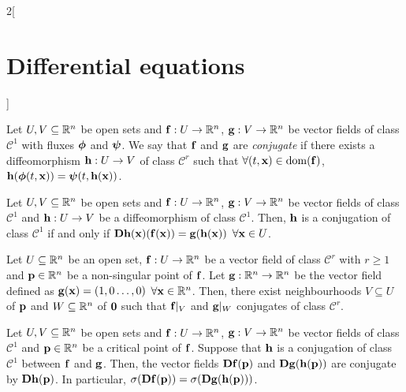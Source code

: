 \documentclass[../../../main.tex]{subfiles}
\begin{document}
\begin{multicols}{2}[\section{Differential equations}]
\begin{definition}
    \end{definition}
    \begin{definition}
        Let $U,V\subseteq \RR^n$ be open sets and $\vf{f}:U\rightarrow\RR^n$, $\vf{g}:V\rightarrow\RR^n$ be vector fields of class $\mathcal{C}^1$ with fluxes $\vf{\phi}$ and $\vf{\psi}$. We say that $\vf{f}$ and $\vf{g}$ are \textit{conjugate} if there exists a diffeomorphism $\vf{h}:U\rightarrow V$ of class $\mathcal{C}^r$ such that $\forall (t,\vf{x})\in \domain(\vf{f})$, $\vf{h}(\vf{\phi}(t,\vf{x}))=\vf{\psi}(t,\vf{h}(\vf{x}))$.
    \end{definition}
    \begin{lemma}
        Let $U,V\subseteq \RR^n$ be open sets and $\vf{f}:U\rightarrow\RR^n$, $\vf{g}:V\rightarrow\RR^n$ be vector fields of class $\mathcal{C}^1$ and $\vf{h}:U\rightarrow V$ be a diffeomorphism of class $\mathcal{C}^1$. Then, $\vf{h}$ is a conjugation of class $\mathcal{C}^1$ if and only if $\vf{Dh}(\vf{x})(\vf{f}(\vf{x}))=\vf{g}(\vf{h}(\vf{x}))$ $\forall \vf{x}\in U$.
    \end{lemma}
    \begin{theorem}
        Let $U\subseteq \RR^n$ be an open set, $\vf{f}:U\rightarrow\RR^n$ be a vector field of class $\mathcal{C}^r$ with $r\geq 1$ and $\vf{p}\in\RR^n$ be a non-singular point of $\vf{f}$. Let $\vf{g}:\RR^n\rightarrow\RR^n$ be the vector field defined as $\vf{g}(\vf{x})=(1,0\ldots,0)$ $\forall \vf{x}\in\RR^n$. Then, there exist neighbourhoods $V\subseteq U$ of $\vf{p}$ and $W\subseteq \RR^n$ of $\vf{0}$ such that $\vf{f}|_V$ and $\vf{g}|_W$ conjugates of class $\mathcal{C}^r$.
    \end{theorem}
    \begin{lemma}
        Let $U,V\subseteq \RR^n$ be open sets and $\vf{f}:U\rightarrow\RR^n$, $\vf{g}:V\rightarrow\RR^n$ be vector fields of class $\mathcal{C}^1$ and $\vf{p}\in\RR^n$ be a critical point of $\vf{f}$. Suppose that $\vf{h}$ is a conjugation of class $\mathcal{C}^1$ between $\vf{f}$ and $\vf{g}$. Then, the vector fields $\vf{Df}(\vf{p})$ and $\vf{Dg}(\vf{h}(\vf{p}))$ are conjugate by $\vf{Dh}(\vf{p})$. In particular, $\sigma(\vf{Df}(\vf{p}))=\sigma(\vf{Dg}(\vf{h}(\vf{p})))$.
    \end{lemma}

\end{multicols}
\end{document}
